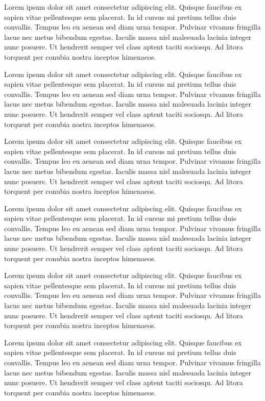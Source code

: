 Lorem ipsum dolor sit amet consectetur adipiscing elit. Quisque faucibus ex sapien vitae pellentesque sem placerat. In id cursus mi pretium tellus duis convallis. Tempus leo eu aenean sed diam urna tempor. Pulvinar vivamus fringilla lacus nec metus bibendum egestas. Iaculis massa nisl malesuada lacinia integer nunc posuere. Ut hendrerit semper vel class aptent taciti sociosqu. Ad litora torquent per conubia nostra inceptos himenaeos.

Lorem ipsum dolor sit amet consectetur adipiscing elit. Quisque faucibus ex sapien vitae pellentesque sem placerat. In id cursus mi pretium tellus duis convallis. Tempus leo eu aenean sed diam urna tempor. Pulvinar vivamus fringilla lacus nec metus bibendum egestas. Iaculis massa nisl malesuada lacinia integer nunc posuere. Ut hendrerit semper vel class aptent taciti sociosqu. Ad litora torquent per conubia nostra inceptos himenaeos.

Lorem ipsum dolor sit amet consectetur adipiscing elit. Quisque faucibus ex sapien vitae pellentesque sem placerat. In id cursus mi pretium tellus duis convallis. Tempus leo eu aenean sed diam urna tempor. Pulvinar vivamus fringilla lacus nec metus bibendum egestas. Iaculis massa nisl malesuada lacinia integer nunc posuere. Ut hendrerit semper vel class aptent taciti sociosqu. Ad litora torquent per conubia nostra inceptos himenaeos.

Lorem ipsum dolor sit amet consectetur adipiscing elit. Quisque faucibus ex sapien vitae pellentesque sem placerat. In id cursus mi pretium tellus duis convallis. Tempus leo eu aenean sed diam urna tempor. Pulvinar vivamus fringilla lacus nec metus bibendum egestas. Iaculis massa nisl malesuada lacinia integer nunc posuere. Ut hendrerit semper vel class aptent taciti sociosqu. Ad litora torquent per conubia nostra inceptos himenaeos.

Lorem ipsum dolor sit amet consectetur adipiscing elit. Quisque faucibus ex sapien vitae pellentesque sem placerat. In id cursus mi pretium tellus duis convallis. Tempus leo eu aenean sed diam urna tempor. Pulvinar vivamus fringilla lacus nec metus bibendum egestas. Iaculis massa nisl malesuada lacinia integer nunc posuere. Ut hendrerit semper vel class aptent taciti sociosqu. Ad litora torquent per conubia nostra inceptos himenaeos.

Lorem ipsum dolor sit amet consectetur adipiscing elit. Quisque faucibus ex sapien vitae pellentesque sem placerat. In id cursus mi pretium tellus duis convallis. Tempus leo eu aenean sed diam urna tempor. Pulvinar vivamus fringilla lacus nec metus bibendum egestas. Iaculis massa nisl malesuada lacinia integer nunc posuere. Ut hendrerit semper vel class aptent taciti sociosqu. Ad litora torquent per conubia nostra inceptos himenaeos.

